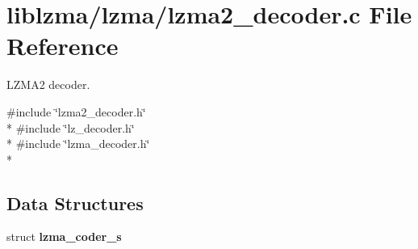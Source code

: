 \section{liblzma/lzma/lzma2\-\_\-decoder.c File Reference}
\label{lzma2__decoder_8c}


L\-Z\-M\-A2 decoder.  


{\ttfamily \#include \char`\"{}lzma2\-\_\-decoder.\-h\char`\"{}}\\*
{\ttfamily \#include \char`\"{}lz\-\_\-decoder.\-h\char`\"{}}\\*
{\ttfamily \#include \char`\"{}lzma\-\_\-decoder.\-h\char`\"{}}\\*
\subsection*{Data Structures}
\begin{DoxyCompactItemize}
\item 
struct {\bf lzma\-\_\-coder\-\_\-s}
\end{DoxyCompactItemize}
